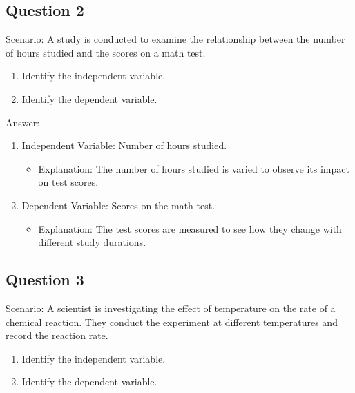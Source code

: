 \documentclass[
  letterpaper,
  DIV=11,
  numbers=noendperiod]{scrreprt}
\providecommand{\tightlist}{%
  \setlength{\itemsep}{0pt}\setlength{\parskip}{0pt}}\usepackage{longtable,booktabs,array}
\begin{document}
\subsection*{Question 2}\label{question-2}

Scenario: A study is conducted to examine the relationship between the
number of hours studied and the scores on a math test.

\begin{enumerate}
\def\labelenumi{\arabic{enumi}.}
\tightlist
\item
  Identify the independent variable.
\item
  Identify the dependent variable.
\end{enumerate}

Answer:

\begin{enumerate}
\def\labelenumi{\arabic{enumi}.}
\tightlist
\item
  Independent Variable: Number of hours studied.

  \begin{itemize}
  \tightlist
  \item
    Explanation: The number of hours studied is varied to observe its
    impact on test scores.
  \end{itemize}
\item
  Dependent Variable: Scores on the math test.

  \begin{itemize}
  \tightlist
  \item
    Explanation: The test scores are measured to see how they change
    with different study durations.
  \end{itemize}
\end{enumerate}

\subsection*{Question 3}\label{question-3}

Scenario: A scientist is investigating the effect of temperature on the
rate of a chemical reaction. They conduct the experiment at different
temperatures and record the reaction rate.

\begin{enumerate}
\def\labelenumi{\arabic{enumi}.}
\tightlist
\item
  Identify the independent variable.
\item
  Identify the dependent variable.
\end{enumerate}
\end{document}
